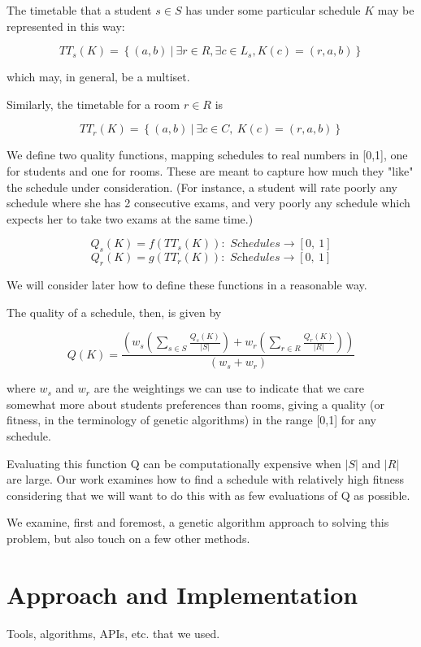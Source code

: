 \documentclass[letterpaper]{article}
\begin{document}
  The timetable that a student $s \in S$ has under some particular schedule 
  $K$ may be represented in this way:
  
  \[ TT_s(K) = \left\{(a, b)\ |\ \exists r \in R, \exists c \in L_s, K(c)=(r, a, b) \right\} \]
  
  which may, in general, be a multiset.
  
  Similarly, the timetable for a room $r \in R$ is
  
  \[ TT_r(K)=\left\{(a, b)\ |\ \exists c\in C,\ K(c)=(r, a, b)\right\} \]
  
  We define two quality functions, mapping schedules to real numbers in [0,1],
  one for students and one for rooms. These are meant to capture how much they
  "like" the schedule under consideration. (For instance, a student will rate
  poorly any schedule where she has 2 consecutive exams, and very poorly any 
  schedule which expects her to take two exams at the same time.)
  
  \[ Q_s(K)=f\left(TT_s(K)\right):\textit{ Schedules}\rightarrow [0,\ 1] \]
  \[ Q_r(K)=g\left(TT_r(K)\right):\textit{ Schedules}\rightarrow [0,\ 1] \]
  
  We will consider later how to define these functions in a reasonable way.

  The quality of a schedule, then, is given by
  
  \[ Q(K)= \frac{\left(w_s\left(\sum_{s \in S}{\frac{Q_s(K)}{|S|}}\right) +
     w_r\left(\sum_{r\in R}{\frac{Q_r(K)}{|R|}} \right)\right)}{(w_s+w_r)} \]
  
  where $w_s$ and $w_r$ are the weightings we can use to indicate that we 
  care somewhat more about students preferences than rooms, giving a quality
  (or fitness, in the terminology of genetic algorithms) in the range [0,1] for
  any schedule.
  
  Evaluating this function Q can be computationally expensive when $|S|$ and $|R|$
  are large. Our work examines how to find a schedule with relatively high fitness
  considering that we will want to do this with as few evaluations of Q as possible.

  We examine, first and foremost, a genetic algorithm approach to solving this problem,
  but also touch on a few other methods.

\section{Approach and Implementation}
  Tools, algorithms, APIs, etc. that we used.
\end{document}
